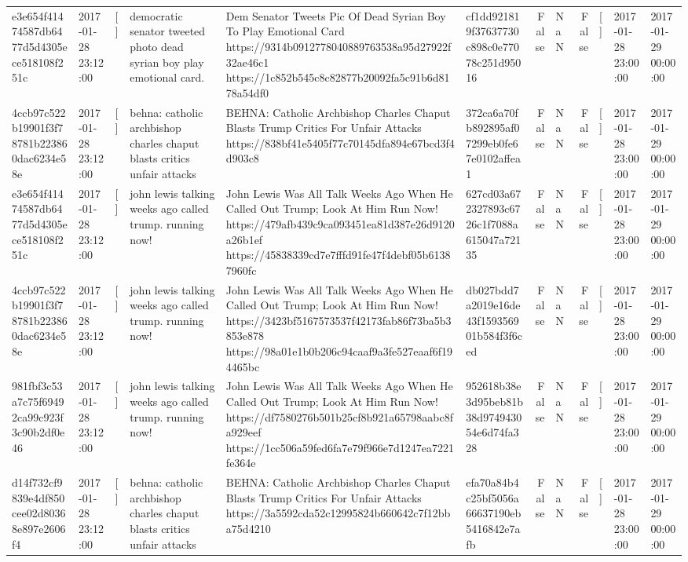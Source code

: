 \begin{tabular}{llllllrlrlll}
e3e654f41474587db6477d5d4305ece518108f251c & 2017-01-28 23:12:00 & [] & democratic senator tweeted photo dead syrian boy play emotional card. & Dem Senator Tweets Pic Of Dead Syrian Boy To Play Emotional Card https://9314b0912778040889763538a95d27922f32ae46c1 https://1c852b545c8c82877b20092fa5c91b6d8178a54df0 & cf1dd921819f37637730c898c0e77078c251d95016 & False & NaN & False & [] & 2017-01-28 23:00:00 & 2017-01-29 00:00:00 \\
4ccb97c522b19901f3f78781b223860dac6234e58e & 2017-01-28 23:12:00 & [] & behna: catholic archbishop charles chaput blasts critics unfair attacks & BEHNA: Catholic Archbishop Charles Chaput Blasts Trump Critics For Unfair Attacks https://838bf41e5405f77c70145dfa894e67bcd3f4d903c8 & 372ca6a70fb892895af07299eb0fe67e0102affea1 & False & NaN & False & [] & 2017-01-28 23:00:00 & 2017-01-29 00:00:00 \\
e3e654f41474587db6477d5d4305ece518108f251c & 2017-01-28 23:12:00 & [] & john lewis talking weeks ago called trump. running now! & John Lewis Was All Talk Weeks Ago When He Called Out Trump; Look At Him Run Now! https://479afb439c9ca093451ea81d387e26d9120a26b1ef https://45838339cd7e7fffd91fe47f4debf05b61387960fc & 627cd03a672327893c6726c1f7088a615047a72135 & False & NaN & False & [] & 2017-01-28 23:00:00 & 2017-01-29 00:00:00 \\
4ccb97c522b19901f3f78781b223860dac6234e58e & 2017-01-28 23:12:00 & [] & john lewis talking weeks ago called trump. running now! & John Lewis Was All Talk Weeks Ago When He Called Out Trump; Look At Him Run Now! https://3423bf5167573537f42173fab86f73ba5b3853e878 https://98a01e1b0b206c94caaf9a3fe527eaaf6f194465bc & db027bdd7a2019e16de43f159356901b584f3f6ced & False & NaN & False & [] & 2017-01-28 23:00:00 & 2017-01-29 00:00:00 \\
981fbf3c53a7c75f69492ca99c923f3c90b2df0e46 & 2017-01-28 23:12:00 & [] & john lewis talking weeks ago called trump. running now! & John Lewis Was All Talk Weeks Ago When He Called Out Trump; Look At Him Run Now! https://df7580276b501b25cf8b921a65798aabc8fa929eef https://1cc506a59fed6fa7e79f966e7d1247ea7221fe364e & 952618b38e3d95beb81b38d974943054e6d74fa328 & False & NaN & False & [] & 2017-01-28 23:00:00 & 2017-01-29 00:00:00 \\
d14f732cf9839e4df850cee02d80368e897e2606f4 & 2017-01-28 23:12:00 & [] & behna: catholic archbishop charles chaput blasts critics unfair attacks & BEHNA: Catholic Archbishop Charles Chaput Blasts Trump Critics For Unfair Attacks https://3a5592cda52c12995824b660642c7f12bba75d4210 & efa70a84b4c25bf5056a66637190eb5416842e7afb & False & NaN & False & [] & 2017-01-28 23:00:00 & 2017-01-29 00:00:00 \\

\end{tabular}
